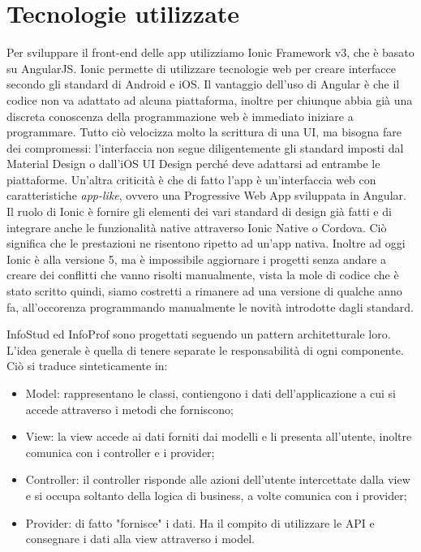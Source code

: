 \documentclass[Lau, oneside]{sapthesis}%
\begin{document}
\section{Tecnologie utilizzate}
\label{sec:tech}
Per sviluppare il front-end delle app utilizziamo Ionic Framework v3, che è basato su AngularJS. Ionic permette di utilizzare tecnologie
web per creare interfacce secondo gli standard di Android e iOS. Il vantaggio dell'uso di Angular è che il codice non va adattato ad alcuna
piattaforma, inoltre per chiunque abbia già una discreta conoscenza della programmazione web è immediato iniziare a programmare. Tutto
ciò velocizza molto la scrittura di una UI, ma bisogna fare dei compromessi: l'interfaccia non segue diligentemente gli standard imposti
dal Material Design o dall'iOS UI Design perché deve adattarsi ad entrambe le piattaforme. Un'altra criticità è che di fatto l'app è
un'interfaccia web con caratteristiche \textit{app-like}, ovvero una Progressive Web App sviluppata in Angular. 
Il ruolo di Ionic è fornire gli elementi dei vari standard di design già fatti e di integrare anche le funzionalità native attraverso
Ionic Native o Cordova. Ciò significa che le prestazioni ne risentono ripetto ad un'app nativa. Inoltre ad oggi Ionic è alla versione 5,
ma è impossibile aggiornare i progetti senza andare a creare dei conflitti che vanno risolti manualmente, vista la mole di codice che è
stato scritto quindi, siamo costretti a rimanere ad una versione di qualche anno fa, all'occorenza programmando manualmente le novità
introdotte dagli standard.

InfoStud ed InfoProf sono progettati seguendo un pattern architetturale loro. L'idea generale è quella di tenere separate le responsabilità
di ogni componente. Ciò si traduce sinteticamente in:

\begin{itemize}
	\item Model: rappresentano le classi, contiengono i dati dell'applicazione a cui si accede attraverso i metodi che forniscono;
	\item View: la view accede ai dati forniti dai modelli e li presenta all'utente, inoltre comunica con i controller e i provider;
	\item Controller: il controller risponde alle azioni dell'utente intercettate dalla view e si occupa soltanto della logica di business, a volte comunica con i provider;
	\item Provider: di fatto "fornisce" i dati. Ha il compito di utilizzare le API e consegnare i dati alla view attraverso i model.
\end{itemize}
\end{document}
